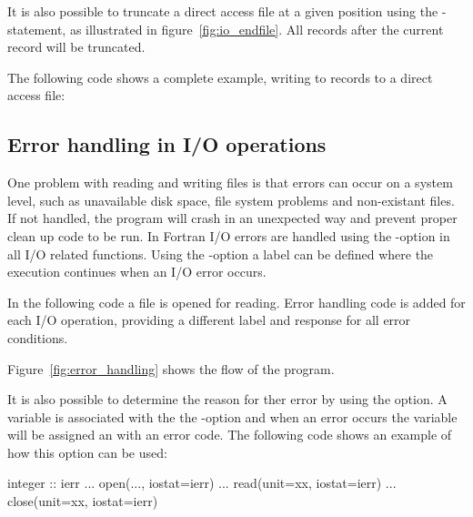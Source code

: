 
It is also possible to truncate a direct access file at a given position using the -statement, as illustrated in figure~\ref{fig:io_endfile}. All records after the current record will be truncated.


The following code shows a complete example, writing to records to a direct access file:


\subsection{Error handling in I/O operations}

One problem with reading and writing files is that errors can occur on a system level, such as unavailable disk space, file system problems and non-existant files. If not handled, the program will crash in an unexpected way and prevent proper clean up code to be run. In Fortran I/O errors are handled using the -option in all I/O related functions. Using the -option a label can be defined where the execution continues when an I/O error occurs. 

In the following code a file is opened for reading. Error handling code is added for each I/O operation, providing a different label and response for all error conditions. 


Figure~\ref{fig:error_handling} shows the flow of the program.


\newpage
It is also possible to determine the reason for ther error by using the  option. A variable is associated with the the -option and when an error occurs the variable will be assigned an with an error code. The following code shows an example of how this option can be used:

\begin{fortrancodeenv}
integer :: ierr
...
open(..., iostat=ierr)
...
read(unit=xx, iostat=ierr)
...
close(unit=xx, iostat=ierr)
\end{fortrancodeenv}

